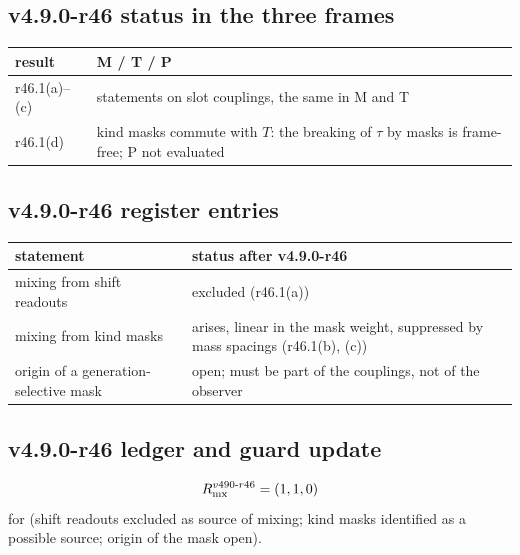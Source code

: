 \subsection*{v4.9.0-r46 status in the three frames}
\label{subsec:v490-r46-frames}

\begin{center}
\small
\begin{tabular}{@{}>{\raggedright\arraybackslash}p{}>{\raggedright\arraybackslash}p{}@{}}
\toprule
result & M / T / P\\
\midrule
r46.1(a)--(c) & statements on slot couplings, the same in M and T\\
r46.1(d) & kind masks commute with \(T\): the breaking of \(\tau\) by masks is frame-free; P not evaluated\\
\bottomrule
\end{tabular}
\end{center}

\subsection*{v4.9.0-r46 register entries}
\label{subsec:v490-r46-register}

\begin{center}
\small
\begin{tabular}{@{}>{\raggedright\arraybackslash}p{}>{\raggedright\arraybackslash}p{}@{}}
\toprule
statement & status after v4.9.0-r46\\
\midrule
mixing from shift readouts & excluded (r46.1(a))\\
mixing from kind masks & arises, linear in the mask weight, suppressed by mass spacings (r46.1(b), (c))\\
origin of a generation-selective mask & open; must be part of the couplings, not of the observer\\
\bottomrule
\end{tabular}
\end{center}

\subsection*{v4.9.0-r46 ledger and guard update}
\label{subsec:v490-r46-ledger-guard}

\[
R_{\rm mx}^{v490\text{-}r46}=(1,1,0)
\]
for (shift readouts excluded as source of mixing; kind masks identified as a possible source; origin of the mask open).

